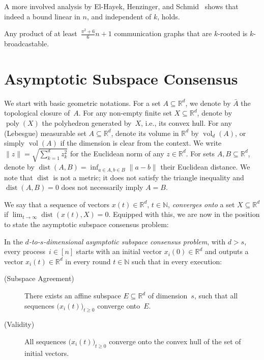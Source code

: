 \documentclass[a4paper,USenglish]{lipics-v2021}
\DeclareMathOperator{\vol}{vol}
\DeclareMathOperator{\dist}{dist}
\newcommand{\IR}{\mathbb{R}}
\newcommand{\IN}{\mathbb{N}}
\renewcommand{\geq}{\geqslant}
\DeclareMathOperator\poly{poly}
\begin{document}
A more involved analysis by El-Hayek, Henzinger, and Schmid~\cite{el2023asymptotically} shows that indeed a bound linear in $n$, and independent of $k$, holds.

\begin{theorem}\label{thm:rooted:to:broadcastable}
	Any product of at least~$\frac{\pi^2+6}{6}n + 1$ communication graphs that are $k$-rooted is
	$k$-broadcastable.
\end{theorem}



\section{Asymptotic Subspace Consensus}\label{sec:problem}

We start with basic geometric notations.
For a set $A\subseteq \IR^d$, we denote by $\bar{A}$ the topological closure
of~$A$.
For any non-empty finite set $X\subseteq \IR^d$, denote by $\poly(X)$ the
polyhedron generated by~$X$, i.e., its convex hull.
For any (Lebesgue) measurable set $A\subseteq \IR^d$, denote its volume in $\IR^d$ by
$\vol_d(A)$, or simply $\vol(A)$ if the dimension is clear from the context.
We write $\lVert z \rVert = \sqrt{\sum_{k=1}^d z_k^2}$ for the Euclidean norm of any $z\in\IR^d$.
For sets $A, B\subseteq \IR^d$, denote by
$\dist(A,B)
	=
	\inf_{a \in A, b \in B} \lVert a - b \rVert
$
their Euclidean distance.
We note that $\dist$ is not a metric; it does not satisfy the triangle inequality and $\dist(A,B) = 0$ does not necessarily imply $A=B$.

We say that a sequence of vectors $x(t) \in \IR^d$, $t \in \IN$, \emph{converges onto}
a set $X \subseteq \IR^d$ if $\displaystyle\lim_{t\to\infty}\dist(x(t),X) = 0$.
Equipped with this, we are now in the position to state the asymptotic subspace consensus problem:

In the \emph{$d$-to-$s$-dimensional asymptotic subspace consensus problem}, with $d > s$, every process~$i \in [n]$ starts with an initial vector $x_i(0) \in \IR^d$ and outputs a vector $x_i(t) \in \IR^d$ in every round $t\in\IN$ such that in every execution:
\begin{description}
	\item[(Subspace Agreement)] There exists an affine subspace $E\subseteq \IR^d$ of dimension~$s$, such that all sequences $\big(x_i(t)\big)_{t \geq 0}$ converge onto~$E$.

	\item[(Validity)] All sequences $\big(x_i(t)\big)_{t \geq 0}$ converge onto the convex hull of the set of initial vectors.

\end{description}
\end{document}
